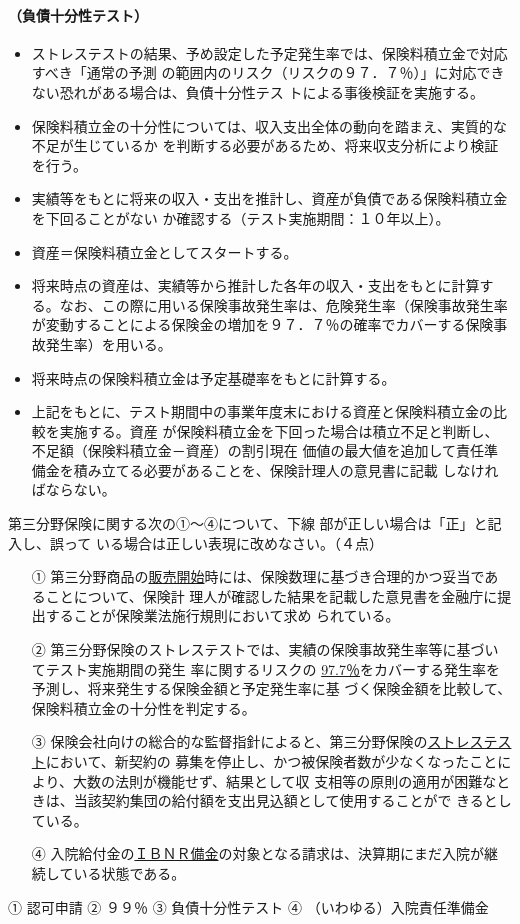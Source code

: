 \documentclass[report,gutter=10mm,fore-edge=10mm,uplatex,dvipdfmx]{jlreq}
\begin{document}
\paragraph{（負債十分性テスト）}
\begin{itemize}
 \item ストレステストの結果、予め設定した予定発生率では、保険料積立金で対応すべき「通常の予測
の範囲内のリスク（リスクの９７．７％）」に対応できない恐れがある場合は、負債十分性テス
トによる事後検証を実施する。
 \item 保険料積立金の十分性については、収入支出全体の動向を踏まえ、実質的な不足が生じているか
を判断する必要があるため、将来収支分析により検証を行う。
 \item 実績等をもとに将来の収入・支出を推計し、資産が負債である保険料積立金を下回ることがない
か確認する（テスト実施期間：１０年以上）。
 \item 資産＝保険料積立金としてスタートする。
 \item 将来時点の資産は、実績等から推計した各年の収入・支出をもとに計算する。なお、この際に用いる保険事故発生率は、危険発生率（保険事故発生率が変動することによる保険金の増加を９７．７％の確率でカバーする保険事故発生率）を用いる。
 \item 将来時点の保険料積立金は予定基礎率をもとに計算する。
 \item 上記をもとに、テスト期間中の事業年度末における資産と保険料積立金の比較を実施する。資産
が保険料積立金を下回った場合は積立不足と判断し、不足額（保険料積立金－資産）の割引現在
価値の最大値を追加して責任準備金を積み立てる必要があることを、保険計理人の意見書に記載
しなければならない。
\end{itemize}

第三分野保険に関する次の①～④について、下線
部が正しい場合は「正」と記入し、誤って
いる場合は正しい表現に改めなさい。（４点）
\begin{enumerate}
 \item [①] 第三分野商品の\underline{販売開始}時には、保険数理に基づき合理的かつ妥当であることについて、保険計
 理人が確認した結果を記載した意見書を金融庁に提出することが保険業法施行規則において求め
 られている。
 \item [②] 第三分野保険のストレステストでは、実績の保険事故発生率等に基づいてテスト実施期間の発生
 率に関するリスクの \underline{97.7％}をカバーする発生率を予測し、将来発生する保険金額と予定発生率に基
 づく保険金額を比較して、保険料積立金の十分性を判定する。
 \item [③] 保険会社向けの総合的な監督指針によると、第三分野保険の\underline{ストレステスト}において、新契約の
 募集を停止し、かつ被保険者数が少なくなったことにより、大数の法則が機能せず、結果として収
 支相等の原則の適用が困難なときは、当該契約集団の給付額を支出見込額として使用することがで
 きるとしている。
 \item [④] 入院給付金の\underline{ＩＢＮＲ備金}の対象となる請求は、決算期にまだ入院が継続している状態である。
\end{enumerate}
① 認可申請 ② ９９％ ③ 負債十分性テスト ④ （いわゆる）入院責任準備金
\end{document}
